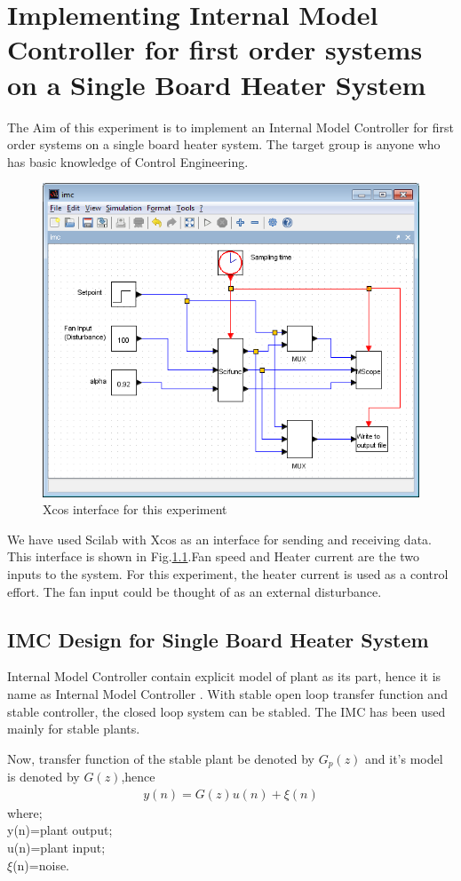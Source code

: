 \chapter{Implementing Internal Model Controller for first order systems on a Single Board Heater System}
The Aim of this experiment is to implement an Internal Model Controller for first order systems on a single board heater system. The target group is anyone who has basic knowledge of Control Engineering.
\begin{figure}
	\centering
		\includegraphics[width=\linewidth]{IMC/imc_xcos.png}
	\caption{Xcos interface for this experiment}
	\label{Xcos_imc}
\end{figure}
We have used Scilab with Xcos as an interface for sending and receiving data. This interface is shown in Fig.\ref{Xcos_imc}.Fan speed and Heater current are the two inputs to the system. For this experiment, the heater current is used as a control effort. The fan input could be thought of as an external disturbance.

\section{IMC Design for Single Board Heater System}
Internal Model Controller contain explicit model of plant as its part, hence it is name as Internal Model Controller \cite{kmm09}. 
With stable open loop transfer function and stable controller, the closed loop system can be stabled. The IMC has been used mainly for stable plants.

Now, transfer function of the stable plant be denoted by $G_p (z)$ and it's model is denoted by $G(z)$,hence
\begin{align}
y(n)=G(z)u(n)+\xi(n) 
\end{align}
where; \\
y(n)=plant output;\\
      u(n)=plant input;\\
      $\xi$(n)=noise.
      
